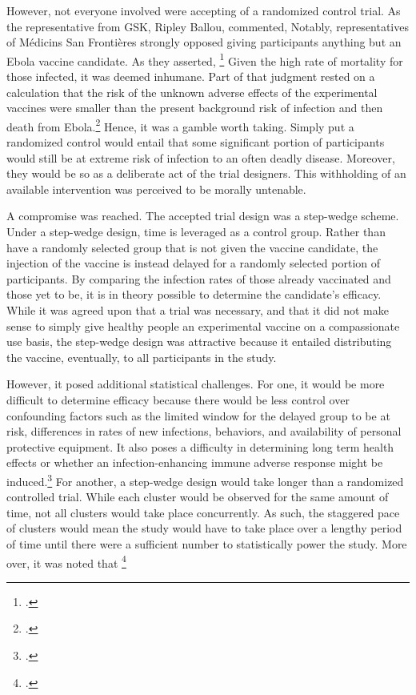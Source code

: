 \documentclass[letterpaper,notitlepage,12pt]{article}
\begin{document}
However, not everyone involved were accepting of a randomized control trial.
As the representative from GSK, Ripley Ballou, commented, 
Notably, representatives of M\'{e}dicins San Fronti\`{e}res strongly opposed
giving participants anything but an Ebola vaccine candidate.
As they asserted, \footcite{Science}
Given the high rate of mortality for those infected, it was deemed inhumane.
Part of that judgment rested on a calculation that the risk of the unknown
adverse effects of the experimental vaccines were smaller than the present
background risk of infection and then death from Ebola.\footcite[p. 114]{NAP}
Hence, it was a gamble worth taking.
Simply put a randomized control would entail that some significant portion of
participants would still be at extreme risk of infection to an often deadly
disease.
Moreover, they would be so as a deliberate act of the trial designers.
This withholding of an available intervention was perceived to be morally
untenable.

A compromise was reached.
The accepted trial design was a step-wedge scheme.
Under a step-wedge design, time is leveraged as a control group.
Rather than have a randomly selected group that is not given the vaccine
candidate, the injection of the vaccine is instead delayed for a randomly
selected portion of participants.
By comparing the infection rates of those already vaccinated and those yet to
be, it is in theory possible to determine the candidate's efficacy.
While it was agreed upon that a trial was necessary, and that it did not make
sense to simply give healthy people an experimental vaccine on a compassionate
use basis, the step-wedge design was attractive because it entailed
distributing the vaccine, eventually, to all participants in the study.

However, it posed additional statistical challenges.
For one, it would be more difficult to determine efficacy because there would be
less control over confounding factors such as the limited window for the delayed
group to be at risk, differences in rates of new infections, behaviors, and
availability of personal protective equipment.
It also poses a difficulty in determining long term health effects or whether an 
infection-enhancing immune adverse response might be induced.\footcite[p. 116]
{NAP}
For another, a step-wedge design would take longer than a randomized controlled
trial.
While each cluster would be observed for the same amount of time, not all
clusters would take place concurrently.
As such, the staggered pace of clusters would mean the study would have to take
place over a lengthy period of time until there were a sufficient number to
statistically power the study. 
More over, it was noted that \footcite{ebola
ca suffit ring vaccintation trial consortium, 2015}
\end{document}
